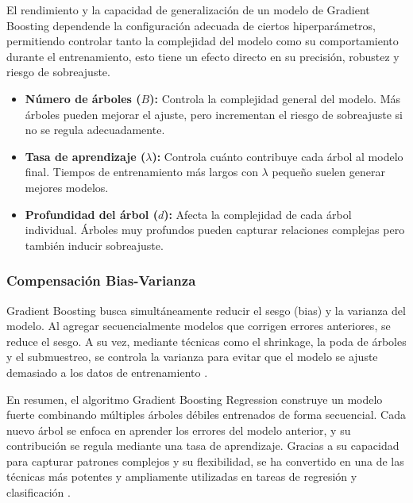 El rendimiento y la capacidad de generalización de un modelo de Gradient Boosting dependende la configuración adecuada de ciertos hiperparámetros, permitiendo controlar tanto la complejidad del modelo como su comportamiento durante el entrenamiento, esto tiene un efecto directo en su precisión, robustez y riesgo de sobreajuste.

\begin{itemize}
	\item \textbf{Número de árboles ($B$):} Controla la complejidad general del modelo. Más árboles pueden mejorar el ajuste, pero incrementan el riesgo de sobreajuste si no se regula adecuadamente.
	\item \textbf{Tasa de aprendizaje ($\lambda$):} Controla cuánto contribuye cada árbol al modelo final. Tiempos de entrenamiento más largos con $\lambda$ pequeño suelen generar mejores modelos.
	\item \textbf{Profundidad del árbol ($d$):} Afecta la complejidad de cada árbol individual. Árboles muy profundos pueden capturar relaciones complejas pero también inducir sobreajuste.
\end{itemize}

\subsubsection{Compensación Bias-Varianza}

Gradient Boosting busca simultáneamente reducir el sesgo (bias) y la varianza del modelo. Al agregar secuencialmente modelos que corrigen errores anteriores, se reduce el sesgo. A su vez, mediante técnicas como el shrinkage, la poda de árboles y el submuestreo, se controla la varianza para evitar que el modelo se ajuste demasiado a los datos de entrenamiento \citep{james2013}.

\bigskip

En resumen, el algoritmo Gradient Boosting Regression construye un modelo fuerte combinando múltiples árboles débiles entrenados de forma secuencial. Cada nuevo árbol se enfoca en aprender los errores del modelo anterior, y su contribución se regula mediante una tasa de aprendizaje. Gracias a su capacidad para capturar patrones complejos y su flexibilidad, se ha convertido en una de las técnicas más potentes y ampliamente utilizadas en tareas de regresión y clasificación \citep{james2013, veirana2021, hastie2009, friedman2001}.

	